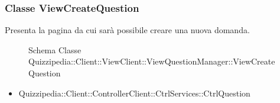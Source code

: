 \subsubsection{Classe ViewCreateQuestion}
Presenta la pagina da cui sarà possibile creare una nuova domanda.
\begin{figure}[H]
\centering
\noindent{}
\caption[Schema Classe ViewCreateQuestion]{Schema Classe Quizzipedia::Client::ViewClient::ViewQuestionManager::ViewCreateQuestion}
\end{figure}
\begin{itemize}
\item Quizzipedia::Client::ControllerClient::CtrlServices::CtrlQuestion
\end{itemize}
